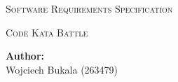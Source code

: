 \begin{titlepage}
    \centering

    \vfill
    
    {\scshape\LARGE Software Requirements Specification\par}
    {\scshape\Large Code Kata Battle\par}
    

    \vfill
    
    \begin{flushleft}
    \textbf{Author:}\\
    Wojciech Bukala (263479)\\

    \end{flushleft}

    \vspace{1cm}
    
\end{titlepage}